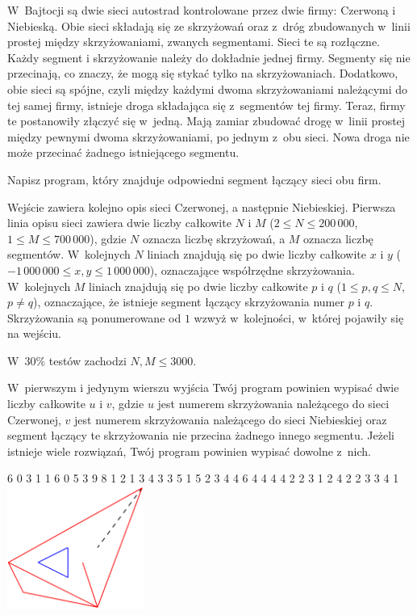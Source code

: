 

\usepackage[utf8]{inputenc}
\usepackage[T1]{fontenc}
\usepackage[polish]{babel}
\usepackage{polski}





W~Bajtocji są dwie sieci autostrad kontrolowane przez dwie firmy: Czerwoną i Niebieską.
Obie sieci składają się ze skrzyżowań oraz z~dróg zbudowanych w~linii prostej między skrzyżowaniami, zwanych segmentami.
Sieci te są rozłączne.
Każdy segment i skrzyżowanie należy do dokładnie jednej firmy.
Segmenty się nie przecinają, co znaczy, że mogą się stykać tylko na skrzyżowaniach.
Dodatkowo, obie sieci są spójne, czyli między każdymi dwoma skrzyżowaniami należącymi do tej samej firmy,
	istnieje droga składająca się z~segmentów tej firmy.
Teraz, firmy te postanowiły złączyć się w~jedną.
Mają zamiar zbudować drogę w~linii prostej między pewnymi dwoma skrzyżowaniami, po jednym z~obu sieci.
Nowa droga nie może przecinać żadnego istniejącego segmentu. 


Napisz program, który znajduje odpowiedni segment łączący sieci obu firm.


Wejście zawiera kolejno opis sieci Czerwonej, a następnie Niebieskiej.
Pierwsza linia opisu sieci zawiera dwie liczby całkowite $N$ i $M$
	($2 \le N \le 200\,000$, $1 \le M \le 700\,000$), gdzie $N$ oznacza liczbę skrzyżowań, a $M$ oznacza liczbę segmentów.
W~kolejnych $N$ liniach znajdują się po dwie liczby całkowite $x$ i $y$
	($-1\,000\,000 \le x, y \le 1\,000\,000$), oznaczające współrzędne skrzyżowania.
W~kolejnych $M$ liniach znajdują się po dwie liczby całkowite $p$ i $q$ ($1 \le p, q \le N$, $p \neq q$), 
	oznaczające, że istnieje segment łączący skrzyżowania numer $p$ i $q$.
Skrzyżowania są ponumerowane od $1$ wzwyż w~kolejności, w~której pojawiły się na wejściu.

W~$30\%$ testów zachodzi $N, M \le 3000$.


W~pierwszym i jedynym wierszu wyjścia Twój program powinien wypisać dwie liczby całkowite $u$ i $v$,
	gdzie $u$ jest numerem skrzyżowania należącego do sieci Czerwonej,
	$v$ jest numerem skrzyżowania należącego do sieci Niebieskiej oraz segment łączący te skrzyżowania nie przecina
	żadnego innego segmentu.
Jeżeli istnieje wiele rozwiązań, Twój program powinien wypisać dowolne z~nich.


 6
0 3
1 1
6 0
5 3
9 8
1 2
1 3
4 3
3 5
1 5
2 3
4 4
6 4
4 4
4 2
2 3
1 2
4 2
2 3
3 4
 1
\sampleCOMMENT
\includegraphics[height=4cm]{img/fig11.pdf}
\sampleEND


